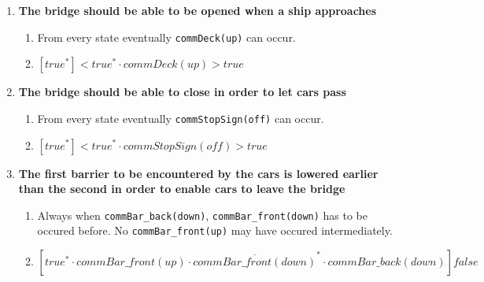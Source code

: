 \begin{enumerate}
	\item \textbf{The bridge should be able to be opened when a ship approaches}
	\begin{enumerate}
		\item From every state eventually \texttt{commDeck(up)} can occur.
		\item $[true^*]<true^* \cdot commDeck(up)>true$
	\end{enumerate}

	\item \textbf{The bridge should be able to close in order to let cars pass}
	\begin{enumerate}
		\item From every state eventually \texttt{commStopSign(off)} can occur.
		\item $[true^*]<true^* \cdot commStopSign(off)>true$
	\end{enumerate}

	\item \textbf{The first barrier to be encountered by the cars is lowered earlier than the second in order to enable cars to leave the bridge}
	\begin{enumerate}
		\item Always when \texttt{commBar\_back(down)}, \texttt{commBar\_front(down)} has to be occured before. No \texttt{commBar\_front(up)} may have occured intermediately.
		\item $[true^* \cdot commBar\_front(up) \cdot \overline{commBar\_front(down)}^{*} \cdot commBar\_back(down)]false$\\
	\end{enumerate}



\end{enumerate}

\newpage
